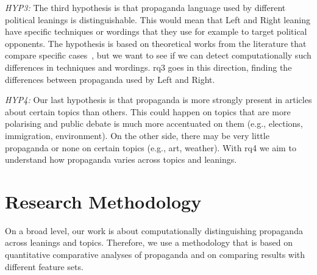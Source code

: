 \emph{HYP3:} The third hypothesis is that propaganda language used by different political leanings is distinguishable. This would mean that Left and Right leaning have specific techniques or wordings that they use for example to target political opponents. The hypothesis is based on theoretical works from the literature that compare specific cases~\citep{blumberg1986comparative}, but we want to see if we can detect computationally such differences in techniques and wordings.
\acrshort{rq}3 goes in this direction, finding the differences between propaganda used by Left and Right.

\emph{HYP4:} Our last hypothesis is that propaganda is more strongly present in articles about certain topics than others. This could happen on topics that are more polarising and public debate is much more accentuated on them (e.g., elections, immigration, environment). On the other side, there may be very little propaganda or none on certain topics (e.g., art, weather).
With \acrshort{rq}4 we aim to understand how propaganda varies across topics and leanings.




\section{\statusgreen Research Methodology}
\label{sec:intro_method}

On a broad level, our work is about computationally distinguishing propaganda across leanings and topics. Therefore, we use a methodology that is based on quantitative comparative analyses of propaganda and on comparing results with different feature sets.

